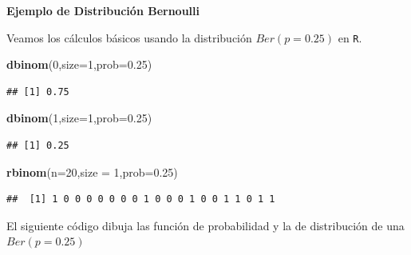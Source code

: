 \documentclass[]{book}
\newenvironment{Shaded}{\begin{snugshade}}{\end{snugshade}}
\newcommand{\DataTypeTok}[1]{\textcolor[rgb]{0.13,0.29,0.53}{#1}}
\newcommand{\DecValTok}[1]{\textcolor[rgb]{0.00,0.00,0.81}{#1}}
\newcommand{\FloatTok}[1]{\textcolor[rgb]{0.00,0.00,0.81}{#1}}
\newcommand{\KeywordTok}[1]{\textcolor[rgb]{0.13,0.29,0.53}{\textbf{#1}}}
\newcommand{\NormalTok}[1]{#1}
\begin{document}
\textbf{Ejemplo de Distribución Bernoulli}

Veamos los cálculos básicos usando la distribución \(Ber(p=0.25)\) en \texttt{R}.

\begin{Shaded}
\begin{Highlighting}[]
\KeywordTok{dbinom}\NormalTok{(}\DecValTok{0}\NormalTok{,}\DataTypeTok{size=}\DecValTok{1}\NormalTok{,}\DataTypeTok{prob=}\FloatTok{0.25}\NormalTok{)}
\end{Highlighting}
\end{Shaded}

\begin{verbatim}
## [1] 0.75
\end{verbatim}

\begin{Shaded}
\begin{Highlighting}[]
\KeywordTok{dbinom}\NormalTok{(}\DecValTok{1}\NormalTok{,}\DataTypeTok{size=}\DecValTok{1}\NormalTok{,}\DataTypeTok{prob=}\FloatTok{0.25}\NormalTok{)}
\end{Highlighting}
\end{Shaded}

\begin{verbatim}
## [1] 0.25
\end{verbatim}

\begin{Shaded}
\begin{Highlighting}[]
\KeywordTok{rbinom}\NormalTok{(}\DataTypeTok{n=}\DecValTok{20}\NormalTok{,}\DataTypeTok{size =} \DecValTok{1}\NormalTok{,}\DataTypeTok{prob=}\FloatTok{0.25}\NormalTok{)}
\end{Highlighting}
\end{Shaded}

\begin{verbatim}
##  [1] 1 0 0 0 0 0 0 0 1 0 0 0 1 0 0 1 1 0 1 1
\end{verbatim}

El siguiente código dibuja las función de probabilidad y la de distribución de una \(Ber(p=0.25)\)
\end{document}
